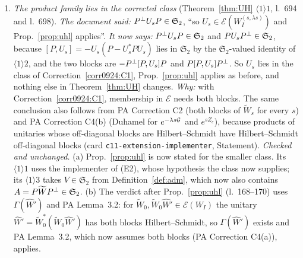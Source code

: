 \documentclass[11pt]{article}
\newcommand{\Wt}{\widetilde W}\newcommand{\kt}{\widetilde k}\newcommand{\Om}{\Omega}\newcommand{\Gm}{\Gamma}
\newcommand{\Stwo}{\mathfrak S_2}\newcommand{\Sone}{\mathfrak S_1}
\begin{document}
\begin{enumerate}[label=\textbf{C\arabic*},ref=C\arabic*,leftmargin=2.6em,itemsep=2pt]
 windings of widths $b_n$ and cut-offs $R_n$ (for $u$ or its complex conjugate, according to the
 sign convention fixed in (E1)).  For one winding the squared Hilbert--Schmidt norms of the two
 blocks are $0.00710$ and $1.00710$ at $R/b=5$, $0.00049$ and $1.00049$ at $R/b=20$, $0.00003$ and
 $1.00003$ at $R/b=80$; they differ by exactly $1$, an index
 (\texttt{numerics/kb-checks-2026-09-23/refb9\_winding.py}, output \texttt{refb9\_winding.out}).
 With $\sum_nb_n/R_n<\infty$ the product has one block Hilbert--Schmidt and the other not, so it is
 not implementable.  Knowledge-base card \texttt{c11-extension-implementer}, Statement: ``with $W'$
 a unitary of $L^2(I')$ such that $P_-(1\oplus W')P_+$ and $P_+(1\oplus W')P_-$ are both
 Hilbert--Schmidt.  The Shale--Stinespring criterion needs both off-diagonal blocks''.
\item\label{corr0924:C2} \emph{The product family lies in the corrected class}
 (Theorem~\ref{thm:UH} $\langle1\rangle1$, l.~694 and l.~698).
 \emph{The document said:} $\Pperp U_sP\in\Stwo$, ``so $U_s\in\mathcal E(W_I^{(s,\lambda s)})$ and
 Prop.~\ref{prop:uhl} applies''.
 \emph{It now says:} $\Pperp U_sP\in\Stwo$ and $PU_s\Pperp\in\Stwo$, because
 $[P,U_s]=-U_s(P-U_s^*PU_s)$ lies in $\Stwo$ by the $\Stwo$-valued identity of
 $\langle1\rangle2$, and the two blocks are $-P^{\perp}[P,U_s]P$ and $P[P,U_s]P^{\perp}$.  So $U_s$
 lies in the class of Correction~\ref{corr0924:C1}, Prop.~\ref{prop:uhl} applies as before, and
 nothing else in Theorem~\ref{thm:UH} changes.
 \emph{Why:} with Correction~\ref{corr0924:C1}, membership in $\mathcal E$ needs both blocks.  The
 same conclusion also follows from PA Correction C2 (both blocks of $\Wt_s$ for every $s$) and PA
 Correction C4(b) (Duhamel for $e^{-\lambda s\mathcal G}$ and $e^{sZ_e}$), because products of unitaries
 whose off-diagonal blocks are Hilbert--Schmidt have Hilbert--Schmidt off-diagonal blocks (card
 \texttt{c11-extension-implementer}, Statement).
 \emph{Checked and unchanged.}  (a) Prop.~\ref{prop:uhl} is now stated for the smaller class.  Its
 $\langle1\rangle1$ uses the implementer of (E2), whose hypothesis the class now supplies; its
 $\langle1\rangle3$ takes $V\in\Stwo$ from Definition~\ref{def:adm}, which now also contains
 $A=P\Wt\Pperp\in\Stwo$.  (b) The verdict after Prop.~\ref{prop:uhl} (l.~168--170) uses
 $\Gm(\widehat W')$ and PA Lemma~3.2: for $\Wt_0,\Wt_0\widehat W'\in\mathcal E(W_I)$ the unitary
 $\widehat W'=\Wt_0^*(\Wt_0\widehat W')$ has both blocks Hilbert--Schmidt, so $\Gm(\widehat W')$
 exists and PA Lemma~3.2, which now assumes both blocks (PA Correction C4(a)), applies.

\end{enumerate}
\end{document}
